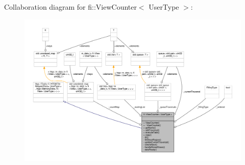 Collaboration diagram for fi\+:\+:View\+Counter$<$ User\+Type $>$\+:
\nopagebreak
\begin{figure}[H]
\begin{center}
\leavevmode
\includegraphics[width=350pt]{d2/d0d/classfi_1_1ViewCounter__coll__graph}
\end{center}
\end{figure}
